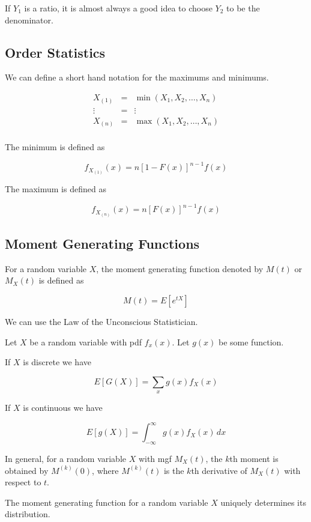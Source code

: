     If $Y_1$ is a ratio, it is almost always a good idea to choose $Y_2$ to be the denominator.

    \subsection{Order Statistics}
    We can define a short hand notation for the maximums and minimums.

    \[
        \begin{array}{ccc}
            X_{(1)} & = & \min(X_1, X_2, \ldots, X_n)\\
            \vdots & = & \vdots\\
            X_{(n)} & = & \max(X_1, X_2, \ldots, X_n)\\
        \end{array}
    \]

    The minimum is defined as

    \[
        f_{X_{(1)}}(x) = n{\left[1 - F(x)\right]}^{n - 1} f(x)
    \]

    The maximum is defined as

    \[
        f_{X_{(n)}}(x) = n{\left[F(x)\right]}^{n - 1} f(x)
    \]

    \subsection{Moment Generating Functions}
    For a random variable $X$, the moment generating function denoted by $M(t)$ or $M_X(t)$ is defined as

    \[
        M(t) = E\left[ e^{tX} \right]
    \]

    We can use the Law of the Unconscious Statistician.

    Let $X$ be a random variable with pdf $f_x(x)$. Let $g(x)$ be some function.

    If $X$ is discrete we have

    \[
        E[G(X)] = \sum_x g(x)f_X(x)
    \]

    If $X$ is continuous we have

    \[
        E[g(X)] = \int_{-\infty}^\infty g(x)f_X(x) \, dx
    \]

    In general, for a random variable $X$ with mgf $M_X(t)$, the $k$th moment is obtained by $M^{(k)}(0)$,
    where $M^{(k)}(t)$ is the $k$th derivative of $M_X(t)$ with respect to $t$.

    The moment generating function for a random variable $X$ uniquely determines its distribution.

